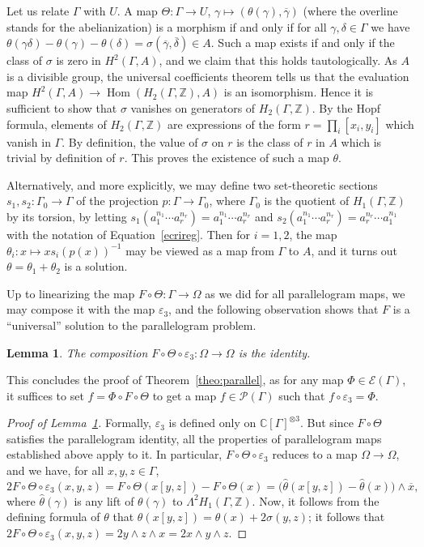 \documentclass[11pt]{article}
\let\mathcal\mathscr
\newtheorem{lemma}[theorem]{Lemma}
\theoremstyle{definition}
\newcommand{\ZZ}{\mathbb{Z}}
\newcommand{\CC}{\mathbb{C}}
\newcommand{\Hom}{\operatorname{Hom}}
\begin{document}
Let us relate $\Gamma$ with $U$. A map $\Theta\colon\Gamma\to U$,
$\gamma\mapsto(\theta(\gamma),\overline{\gamma})$ (where the overline stands
for the abelianization) is a morphism if and only if for all
$\gamma,\delta\in\Gamma$ we have
$\theta(\gamma\delta)-\theta(\gamma)-\theta(\delta)=
\sigma(\overline{\gamma},\overline{\delta})\in A$.
Such a map exists if and only if the class of $\sigma$ is zero in
$H^2(\Gamma,A)$, and we claim that this holds tautologically.
As $A$ is a divisible group, the universal coefficients theorem tells
us that the evaluation map $H^2(\Gamma,A)\to\Hom(H_2(\Gamma,\ZZ),A)$
is an isomorphism. Hence it is sufficient to show that $\sigma$ vanishes on
generators of $H_2(\Gamma,\ZZ)$. By the Hopf formula, elements of
$H_2(\Gamma,\ZZ)$ are expressions of the form $r=\prod_i[x_i,y_i]$ which
vanish in $\Gamma$. By definition, the value of $\sigma$ on $r$ is the class
of $r$ in $A$ which is trivial by definition of $r$.
This proves the existence of such a map $\theta$.

Alternatively, and more explicitly, we may define two set-theoretic sections
$s_1,s_2\colon \Gamma_0\to\Gamma$ of the projection
$p\colon \Gamma\to\Gamma_0$, where $\Gamma_0$ is the quotient of
$H_1(\Gamma,\ZZ)$ by its torsion, by letting
$s_1(a_1^{n_1}\cdots a_r^{n_r})=a_1^{n_1}\cdots a_r^{n_r}$
and $s_2(a_1^{n_1}\cdots a_r^{n_r})=a_r^{n_r}\cdots a_1^{n_1}$ with
the notation of Equation~\eqref{ecrireg}. Then for $i=1,2$,
the map $\theta_i\colon x\mapsto x s_i(p(x))^{-1}$ may be viewed as a
map from $\Gamma$ to $A$, and it turns out $\theta=\theta_1+\theta_2$
is a solution.

Up to linearizing the map $F\circ\Theta\colon\Gamma\to\Omega$ as we did for
all parallelogram maps, we may compose it with the map $\varepsilon_3$, and
the following observation shows that $F$ is a ``universal'' solution
to the parallelogram problem.
\begin{lemma}\label{lem:id}
The composition $F\circ\Theta\circ\varepsilon_3\colon\Omega\to\Omega$
is the identity.
\end{lemma}
This concludes the proof of Theorem~\ref{theo:parallel}, as for any map
$\Phi\in\mathcal{E}(\Gamma)$, it suffices to set $f=\Phi\circ F\circ\Theta$
to get a map $f\in\mathcal{P}(\Gamma)$ such that $f\circ\varepsilon_3=\Phi$.
\begin{proof}[Proof of Lemma~\ref{lem:id}]
Formally, $\varepsilon_3$ is defined only on $\CC[\Gamma]^{\otimes 3}$.
But since $F\circ\Theta$ satisfies the parallelogram identity,
all the properties of parallelogram maps established above apply
to it. In particular, $F\circ\Theta\circ\varepsilon_3$ reduces to
a map $\Omega\to\Omega$, and we have, for all $x,y,z\in\Gamma$,
\[
2F\circ\Theta\circ\varepsilon_3(x,y,z)=
F\circ\Theta(x[y,z])-F\circ\Theta(x) =
\bigl(\widehat{\theta}(x[y,z])-\widehat{\theta}(x)\bigr)\wedge\overline{x},
\]
where $\widehat{\theta}(\gamma)$ is any lift of $\theta(\gamma)$ to
$\Lambda^2H_1(\Gamma,\ZZ)$.
Now, it follows from the defining formula of $\theta$ that
$\theta(x[y,z])=\theta(x)+2\sigma(y,z)$; it follows that
$2F\circ\Theta\circ\varepsilon_3(x,y,z)=
2y\wedge z\wedge x=2x\wedge y\wedge z$.
\end{proof}
\end{document}
